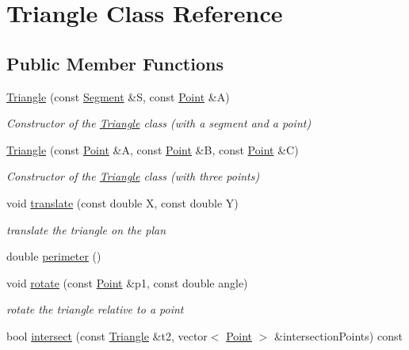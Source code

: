 \hypertarget{class_triangle}{}\section{Triangle Class Reference}
\label{class_triangle}
\subsection*{Public Member Functions}
\begin{DoxyCompactItemize}
\item 
\hyperlink{class_triangle_adb8210bc99b01e6c680a4bb8f72c3707}{Triangle} (const \hyperlink{class_segment}{Segment} \&S, const \hyperlink{class_point}{Point} \&A)
\begin{DoxyCompactList}\small\item\em Constructor of the \hyperlink{class_triangle}{Triangle} class (with a segment and a point) \end{DoxyCompactList}\item 
\hyperlink{class_triangle_a272302dade63e2f5944c1b484b98eea6}{Triangle} (const \hyperlink{class_point}{Point} \&A, const \hyperlink{class_point}{Point} \&B, const \hyperlink{class_point}{Point} \&C)
\begin{DoxyCompactList}\small\item\em Constructor of the \hyperlink{class_triangle}{Triangle} class (with three points) \end{DoxyCompactList}\item 
void \hyperlink{class_triangle_ab7b89a40466185cdddbccf9a86ba4fa8}{translate} (const double X, const double Y)
\begin{DoxyCompactList}\small\item\em translate the triangle on the plan \end{DoxyCompactList}\item 
double \hyperlink{class_triangle_ae329043e5e9e59c486358dad75b1f1c2}{perimeter} ()
\item 
void \hyperlink{class_triangle_abc634b2ea1963e233b13dcd66009ec8d}{rotate} (const \hyperlink{class_point}{Point} \&p1, const double angle)
\begin{DoxyCompactList}\small\item\em rotate the triangle relative to a point \end{DoxyCompactList}\item 
bool \hyperlink{class_triangle_a8f1c191200d6f71717e63fe08e272c57}{intersect} (const \hyperlink{class_triangle}{Triangle} \&t2, vector$<$ \hyperlink{class_point}{Point} $>$ \&intersection\+Points) const

\end{DoxyCompactItemize}

